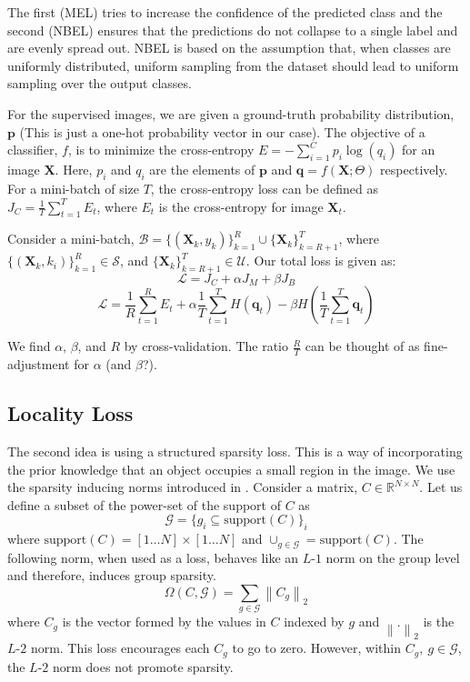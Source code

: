 \documentclass[runningheads]{llncs}
\begin{document}
The first (MEL) tries to increase the confidence of the predicted class and the second (NBEL)
ensures that the predictions do not collapse to a single label and are evenly spread out. NBEL
is based on the assumption that, when classes are uniformly distributed, uniform sampling from the
dataset should lead to uniform sampling over the output classes.

For the supervised images, we are given a ground-truth probability distribution, $\mathbf{p}$ (This is
just a one-hot probability vector in our case). The objective of a classifier, $f$, is to minimize the
cross-entropy $E = -\sum_{i=1}^{C}p_i \log(q_i)$ for an image $\mathbf{X}$. Here, $p_i$ and $q_i$
are the elements of $\mathbf{p}$ and $\mathbf{q} = f(\mathbf{X}; \Theta)$ respectively. For a
mini-batch of size $T$, the cross-entropy loss can be defined as $J_C = \frac{1}{T} \sum_{t=1}^{T}
E_t$, where $E_t$ is the cross-entropy for image $\mathbf{X}_t$.

Consider a mini-batch, $\mathcal{B} =
\{(\mathbf{X}_k, y_k)\}_{k=1}^R \cup \{\mathbf{X}_k\}_{k=R+1}^T$, where $\{(\mathbf{X}_k,
k_i)\}_{k=1}^{R} \in \mathcal{S}$, and $\{\mathbf{X}_k\}_{k=R+1}^{T} \in \mathcal{U}$. Our total loss
is given as:
\begin{equation}
	\mathcal{L} = J_C + \alpha J_M + \beta J_B
\end{equation}
\begin{equation}
	\mathcal{L} = \frac{1}{R} \sum_{t=1}^{R} E_t + \alpha \frac{1}{T}\sum_{t=1}^{T}H(\mathbf{q}_t) -
	\beta H(\frac{1}{T}\sum_{t=1}^{T}\mathbf{q}_t)
\end{equation}

We find $\alpha$, $\beta$, and $R$ by cross-validation. The ratio $\frac{R}{T}$ can be thought of as
fine-adjustment for $\alpha$ (and $\beta$?).


\subsection{Locality Loss}
The second idea is using a structured sparsity loss. This is a way of incorporating the prior knowledge
that an object occupies a small region in the image. We use the sparsity inducing norms introduced in
\cite{groupsparsity,sparsepca}. Consider a matrix, $C \in \mathbb{R}^{N \times
N}$. Let us define a subset of the power-set of the support of $C$ as
\begin{equation}
	\mathcal{G} = \{g_i \subseteq \textrm{support}(C)\}_i
\end{equation}
where $\textrm{support}(C) = [1 \dots N] \times [1 \dots N]$ and $\cup_{g \in \mathcal{G}} = \textrm{support}(C)$. The following norm, when used as a
loss, behaves like an $L$-$1$ norm on the group level and therefore, induces group sparsity.
\begin{equation}
	\Omega (C, \mathcal{G}) = \sum_{g \in \mathcal{G}} \left\lVert C_g \right\rVert _2
\end{equation}
where $C_g$ is the vector formed by the values in $C$ indexed by $g$ and $\left\lVert . \right\rVert_2$ is
the $L$-$2$ norm. This loss encourages each $C_g$ to go to zero. However, within $C_g,~g
\in \mathcal{G}$, the $L$-$2$ norm does not promote sparsity.
\end{document}
